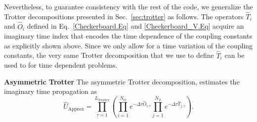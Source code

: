 Nevertheless,   to   guarantee  consistency  with the  rest of  the code,   we    generalize  the  Trotter  decompositions  presented in  Sec.~\ref{sec:trotter}  as  follows.   The  operators   $\hat{T}_{i} $   and  $\hat{O}_{i} $   defined  in  Eq.~\eqref{Checkerboard.Eq}   
and   \eqref{Checkerboard_V.Eq}   acquire  an   imaginary  time index that  encodes  the time  dependence of the coupling  constants   as  explicitly  shown above.      Since we only allow  for a  time variation of the  coupling constants,   the   very same  Trotter  decomposition that we  use  to  define 
$\hat{T}_{i} $      can be  used  to     for  time  dependent  problems. 

\noindent
\textbf{Asymmetric Trotter} 
The asymmetric  Trotter   decomposition,    estimates  the   imaginary time propagation  as 
\begin{equation}
  \hat{U}_{\text{Approx}}  =  \prod_{\tau=1}^{L_\text{Trotter}} \left(\prod_{i=1}^{N_O} e^{-\Delta \tau \hat{O}_{i,\tau}} \prod_{j=1}^{N_T} e^{-\Delta \tau \hat{T}_{j,\tau}}  \right).
  \end{equation}


